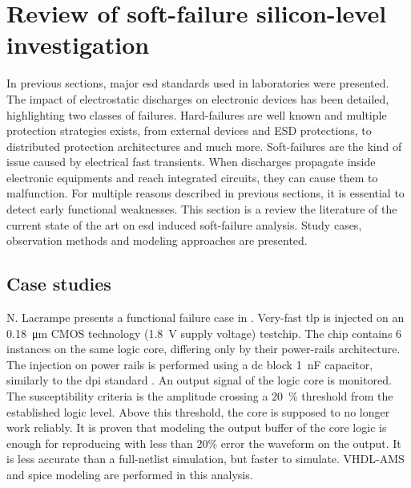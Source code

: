 \section{Review of soft-failure silicon-level investigation}

In previous sections, major \gls{esd} standards used in laboratories were presented.
The impact of electrostatic discharges on electronic devices has been detailed, highlighting two classes of failures.
Hard-failures are well known and multiple protection strategies exists, from external devices and ESD protections, to distributed protection architectures and much more.
Soft-failures are the kind of issue caused by electrical fast transients.
When discharges propagate inside electronic equipments and reach integrated circuits, they can cause them to malfunction.
For multiple reasons described in previous sections, it is essential to detect early functional weaknesses.
This section is a review the literature of the current state of the art on \gls{esd} induced soft-failure analysis.
Study cases, observation methods and modeling approaches are presented.

\subsection{Case studies}

N. Lacrampe presents a functional failure case in \cite{LacrampeTransientImmunity}.
Very-fast \gls{tlp} is injected on an \SI{0.18}{\micro\metre} CMOS technology (\SI{1.8}{\volt} supply voltage) testchip.
The chip contains 6 instances on the same logic core, differing only by their power-rails architecture.
The injection on power rails is performed using a \gls{dc} block \SI{1}{\nano\farad} capacitor, similarly to the \gls{dpi} standard \cite{iec62132-4}.
An output signal of the logic core is monitored.
The susceptibility criteria is the amplitude crossing a \SI{20}{\percent} threshold from the established logic level.
Above this threshold, the core is supposed to no longer work reliably.
It is proven that modeling the output buffer of the core logic is enough for reproducing with less than 20\% error the waveform on the output.
It is less accurate than a full-netlist simulation, but faster to simulate.
VHDL-AMS and \gls{spice} modeling are performed in this analysis.

